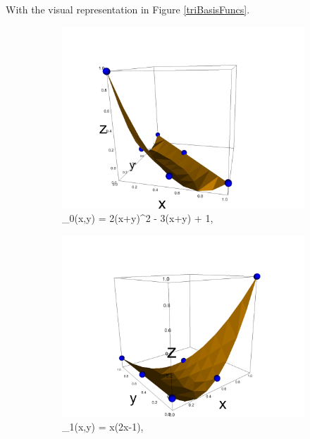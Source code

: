 \documentclass[12pt]{ociamthesis}
\begin{document}
With the visual representation in Figure \ref{triBasisFuncs}.
\begin{figure}[H]
 \begin{subfigure}{0.5\textwidth}
     \includegraphics[width=\textwidth]{Pics/BasisFunc/triBasis0.png}
     \caption{\phi_0(x,y) = 2(x+y)^2 - 3(x+y) + 1,}
 \end{subfigure}
 \hfill
 \begin{subfigure}{0.5\textwidth}
     \includegraphics[width=\textwidth]{Pics/BasisFunc/triBasis1.png}
     \caption{\phi_1(x,y) = x(2x-1),}
 \end{subfigure}
 \hfill
 \begin{subfigure}{0.5\textwidth}

\end{subfigure}
\end{figure}
\end{document}
